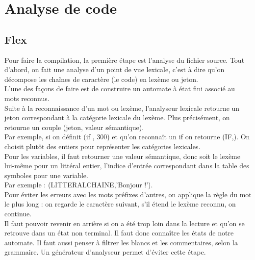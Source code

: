 \section{Analyse de code}

\subsection{Flex}
Pour faire la compilation, la première étape est l'analyse du fichier source.
Tout d'abord, on fait une analyse d'un point de vue lexicale, c'est à dire qu'on décompose les chaînes de caractère (le code) en lexème ou jeton.\\
L'une des façons de faire est de construire un automate à état fini associé au mots reconnus.\\
 Suite à la reconnaissance d'un mot ou lexème, l'analyseur lexicale retourne un jeton correspondant  à la catégorie lexicale du lexème. Plus précisément, on retourne un couple (jeton, valeur sémantique).\\
Par exemple, si on définit  (if , 300) et qu'on reconnaît un if on retourne (IF,).
On choisit plutôt des entiers pour représenter les catégories lexicales.\\
Pour les variables, il faut retourner une valeur sémantique, donc soit le lexème lui-même pour un littéral entier, l'indice d'entrée correspondant dans la table des symboles pour une variable.\\
Par exemple : (LITTERALCHAINE,'Bonjour !').\\
Pour éviter les erreurs avec les mots préfixes d'autres, on applique la règle du mot le plus long : on regarde le caractère suivant, s'il étend le lexème reconnu, on continue.\\
Il faut pouvoir revenir en arrière si on a été trop loin dans la lecture et qu'on se retrouve dans un état non terminal. Il faut donc connaître les états de notre automate.
Il faut aussi penser à filtrer les blancs et les commentaires, selon la grammaire.
Un générateur d'analyseur permet d'éviter cette étape.\\


